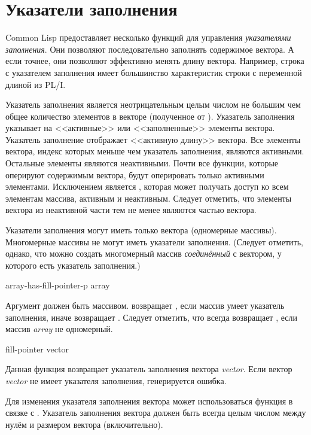 \section{Указатели заполнения}
\label{FILL-POINTER}

Common Lisp предоставляет несколько функций для управления \emph{указателями
  заполнения}. Они позволяют последовательно заполнять содержимое вектора. А
если точнее, они позволяют эффективно менять длину вектора.
Например, строка с указателем заполнения имеет большинство характеристик строки
с переменной длиной из PL/I.

Указатель заполнения является неотрицательным целым числом не большим чем общее
количество элементов в векторе (полученное от ).
Указатель заполнения указывает на <<активные>> или <<заполненные>> элементы
вектора.
Указатель заполнение отображает <<активную длину>> вектора.
Все элементы вектора, индекс которых меньше чем указатель заполнения, являются
активными. Остальные элементы являются неактивными.
Почти все функции, которые оперируют содержимым вектора, будут оперировать
только активными элементами. Исключением является , которая может
получать доступ ко всем элементам массива, активным и неактивным. Следует
отметить, что элементы вектора из неактивной части тем не менее являются частью
вектора.

Указатели заполнения могут иметь только вектора (одномерные массивы).
Многомерные массивы не могут иметь указатели заполнения. (Следует отметить,
однако, что можно создать 
многомерный массив \emph{соединённый} с вектором, у которого есть указатель
заполнения.)

\begin{defun}[Функция]
array-has-fill-pointer-p array

Аргумент должен быть массивом.  возвращает
{\true}, если массив умеет указатель заполнения, иначе возвращает {\false}.
Следует отметить, что  всегда возвращает {\false},
если массив \emph{array} не одномерный.
\end{defun}

\begin{defun}[Функция]
fill-pointer vector

Данная функция возвращает указатель заполнения вектора \emph{vector}. Если
вектор \emph{vector} не имеет указателя заполнения, генерируется ошибка.

Для изменения указателя заполнения вектора может использоваться функция
 в связке с . Указатель заполнения вектора должен
быть всегда целым числом между нулём и размером вектора (включительно).
\end{defun}

